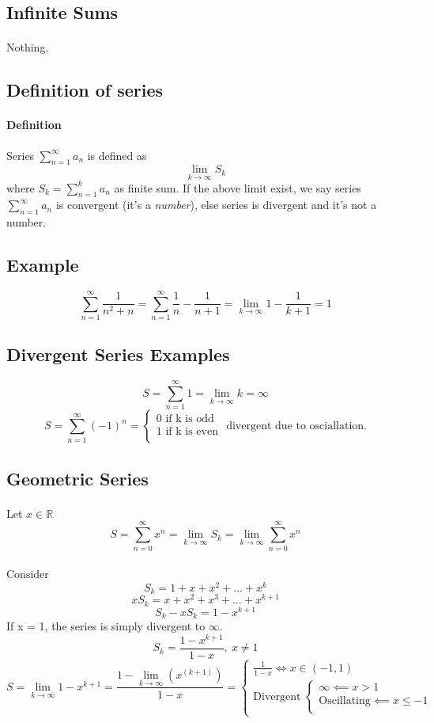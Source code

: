 \documentclass{article}
\newcommand{\R}[0]{\mathbb{R}}
\newcommand{\definition}[0]{\paragraph{Definition}}
\begin{document}
\subsection{Infinite Sums}
\paragraph{} Nothing.
\subsection{Definition of series}
\definition Series $\sum_{n=1}^{\infty}a_n$ is defined as 
\[
	\lim_{k\to\infty}S_k
\]
where $S_k = \sum_{n=1}^{k}a_n$ as finite sum. If the above limit exist, we say series $\sum_{n=1}^{\infty}a_n$ is convergent (it's a \emph{number}), else series is divergent and it's not a number.

\subsection{Example}
\[
	\sum_{n=1}^{\infty}{\frac{1}{n^2+n}} = \sum_{n=1}^{\infty}{\frac{1}{n} - \frac{1}{n+1}} = \lim_{k\to\infty}{1-\frac{1}{k+1}} = 1
\]

\subsection{Divergent Series Examples}
\[
	S = \sum_{n=1}^{\infty}1 = \lim_{k\to\infty}k = \infty
\]
\[
	S = \sum_{n=1}^{\infty}(-1)^n = \begin{cases}
		0 \text{ if k is odd} \\
		1 \text{ if k is even} \\
	\end{cases} \text{ divergent due to osciallation.}
\]

\subsection{Geometric Series}
\paragraph{} Let $x \in \R$
\[
	S = \sum_{n=0}^{\infty}x^n = \lim_{k\to\infty}S_k = \lim_{k\to\infty}\sum_{n=0}^{\infty}x^n
\]
\paragraph{} Consider
\[
	S_k = 1 + x + x^2 + \dots + x^k
\]
\[
	x S_k = x + x^2 + x^3 + \dots + x^{k+1}
\]
\[
	S_k - x S_k = 1 - x^{k+1}
\] If x = 1, the series is simply divergent to $\infty$.
\[
	S_k = \frac{1-x^{k+1}}{1-x},\ x \neq 1
\]
\[
	S = \lim_{k\to\infty}{1 - x^{k+1}} = 
	\frac{1 - \lim_{k\to\infty}(x^(k+1))}{1-x} = 
	\begin{cases}
		\frac{1}{1-x} \iff x \in (-1, 1) \\
		\text{Divergent } \begin{cases}
			\infty \impliedby x > 1 \\
			\text{Oscillating} \impliedby x \leq -1 \\
		\end{cases}
	\end{cases}
\]
\end{document}
